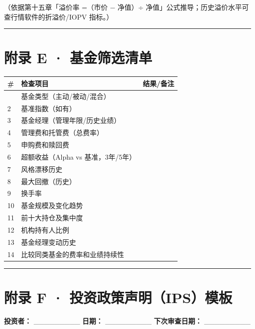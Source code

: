 \documentclass[a4paper,11pt,oneside,fontset=none,UTF8,zihao=-4]{ctexbook}
\begin{document}
（依据第十五章「溢价率 =（市价 − 净值）÷
净值」公式推导；历史溢价水平可查行情软件的折溢价/IOPV 指标。）

\begin{center}{\color{dh-bronze}\rule{0.2\textwidth}{0.5pt}}\end{center}

\section{附录 E ·
基金筛选清单}\label{ux9644ux5f55-e-ux57faux91d1ux7b5bux9009ux6e05ux5355}

\begin{longtable}[]{@{}lll@{}}
\toprule\noalign{}\rowcolor{dh-pink!25}
\# & 检查项目 & 结果/备注 \\
\midrule\noalign{}
\endhead
\bottomrule\noalign{}
\endlastfoot
1 & 基金类型（主动/被动/混合） & \\
2 & 基准指数（如有） & \\
3 & 基金经理（管理年限/历史业绩） & \\
4 & 管理费和托管费（总费率） & \\
5 & 申购费和赎回费 & \\
6 & 超额收益（Alpha vs 基准，3年/5年） & \\
7 & 风格漂移历史 & \\
8 & 最大回撤（历史） & \\
9 & 换手率 & \\
10 & 基金规模及变化趋势 & \\
11 & 前十大持仓及集中度 & \\
12 & 机构持有人比例 & \\
13 & 基金经理变动历史 & \\
14 & 比较同类基金的费率和业绩持续性 & \\
\end{longtable}

\begin{center}{\color{dh-bronze}\rule{0.2\textwidth}{0.5pt}}\end{center}

\section{附录 F ·
投资政策声明（IPS）模板}\label{ux9644ux5f55-f-ux6295ux8d44ux653fux7b56ux58f0ux660eipsux6a21ux677f}

\textbf{投资者：} \_\_\_\_\_\_\_\_\_ \textbf{日期：} \_\_\_\_\_\_\_\_\_
\textbf{下次审查日期：} \_\_\_\_\_\_\_\_\_
\end{document}
